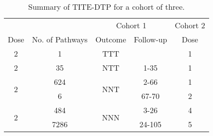 \begin{table}[H]
	\centering
	\caption{Summary of TITE-DTP for a cohort of three.}
	\label{tab_tite-dtp:TITEDTP_c3_Sum}
	\begin{tabular}{ccccc}
		\toprule
		\multicolumn{1}{l}{} & 				   &\multicolumn{2}{c}{Cohort 1}                       & Cohort 2 \\ 
		\cmidrule(l{3pt}r{3pt}){3-4} \cmidrule(l{3pt}r{3pt}){5-5}
		Dose                 & No. of Pathways & Outcome              & Follow-up & Dose     \\ \hline
		2                    & 1               & TTT                  &           & 1        \\ \hline
		2                    & 35              & NTT                  & 1-35      & 1        \\ \hline
		\multirow{2}{*}{2}   & 624             & \multirow{2}{*}{NNT} & 2-66      & 1        \\
		& 6               &                      & 67-70     & 2        \\ \hline
		\multirow{2}{*}{2}   & 484             & \multirow{2}{*}{NNN} & 3-26      & 4        \\
		& 7286            &                      & 24-105    & 5        \\ 
		\bottomrule
	\end{tabular}
\end{table}

